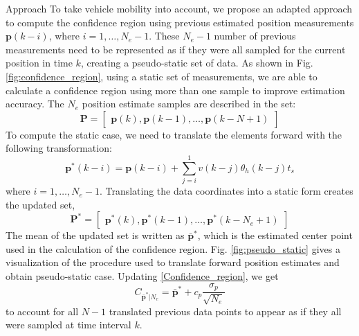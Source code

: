 \begin{section}{Approach}
To take vehicle mobility into account, we propose an adapted approach to compute the confidence region using previous estimated position measurements $\bm{p}(k-i)$, where $i=1,\dots,N_e-1$. These $N_e-1$ number of previous measurements need to be represented as if they were all sampled for the current position in time $k$, creating a pseudo-static set of data. As shown in Fig. \ref{fig:confidence_region}, using a static set of measurements, we are able to calculate a confidence region using more than one sample to improve estimation accuracy. The $N_e$ position estimate samples are described in the set:
\begin{equation}
    \bm{P}=\begin{bmatrix} \bm{p}(k) ,\bm{p}(k-1),\dots,\bm{p}(k-N+1) \end{bmatrix} 
\end{equation}
To compute the static case, we need to translate the elements forward with the following transformation:
	\begin{equation}
	\bm{p}^*(k-i) = \bm{p}(k-i)+\sum_{j=i}^1 v(k-j)\theta_h(k-j)t_s 
	\end{equation}
where $i=1,\dots,N_e-1$. Translating the data coordinates into a static form creates the updated set,
\begin{equation}
    \bm{P}^*=\begin{bmatrix} \bm{p}^*(k) ,\bm{p}^*(k-1),\dots,\bm{p}^*(k-N_e+1) \end{bmatrix} \nonumber
\end{equation}
The mean of the updated set is written as $\bar{\bm{p}}^*$, which is the estimated center point used in the calculation of the confidence region. Fig. \ref{fig:pseudo_static} gives a visualization of the procedure used to translate forward position estimates and obtain pseudo-static case. Updating \eqref{Confidence_region}, we get
    \begin{equation}
    \label{Confidence_region_updated}
		C_{\bar{\bm{p}}^*|N_e} = \bar{\bm{p}}^* + c_p\frac{\sigma_p}{\sqrt{N_e}}
	\end{equation}
 to account for all $N-1$ translated previous data points to appear as if they all were sampled at time interval $k$.




\end{section}
